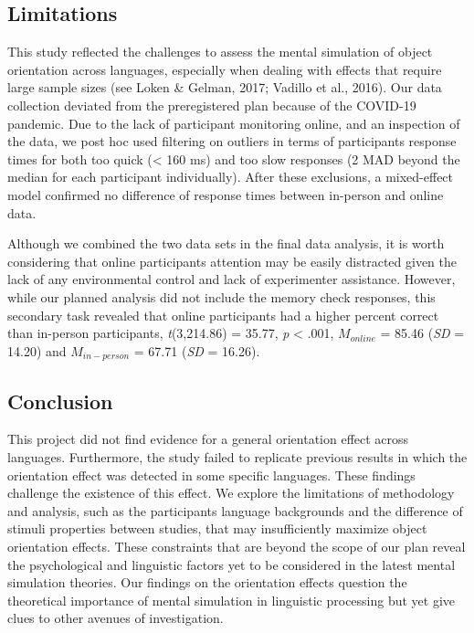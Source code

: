\documentclass[
  man,floatsintext]{apa7}
\begin{document}
\hypertarget{limitations}{%
\subsection{Limitations}\label{limitations}}

This study reflected the challenges to assess the mental simulation of
object orientation across languages, especially when dealing with
effects that require large sample sizes (see Loken \& Gelman, 2017; Vadillo et al., 2016). Our data collection deviated from
the preregistered plan because of the COVID-19 pandemic. Due to the lack
of participant monitoring online, and an inspection of the data, we post
hoc used filtering on outliers in terms of participants\textquotesingle{} response times
for both too quick (\textless{} 160 ms) and too slow responses (2 MAD beyond the
median for each participant individually). After these exclusions, a
mixed-effect model confirmed no difference of response times between
in-person and online data.

Although we combined the two data sets in the final data analysis, it is
worth considering that online participants\textquotesingle{} attention may be easily
distracted given the lack of any environmental control and lack of
experimenter assistance. However, while our planned analysis did not include the memory
check responses, this secondary task revealed that online
participants had a higher percent correct than in-person participants, \emph{t}(3,214.86) = 35.77, \emph{p} \textless{} .001, \(M_{online}\) = 85.46 (\emph{SD} = 14.20) and \(M_{in-person}\) = 67.71 (\emph{SD} = 16.26).

\hypertarget{conclusion}{%
\subsection{Conclusion}\label{conclusion}}

This project did not find evidence for a general orientation effect
across languages. Furthermore, the study failed to replicate previous
results in which the orientation effect was detected in some specific
languages. These findings challenge the existence of this effect. We
explore the limitations of methodology and analysis, such as the
participants\textquotesingle{} language backgrounds and the difference of stimuli
properties between studies, that may insufficiently maximize object
orientation effects. These constraints that are beyond the scope of our
plan reveal the psychological and linguistic factors yet to be
considered in the latest mental simulation theories. Our findings on the
orientation effects question the theoretical importance of mental
simulation in linguistic processing but yet give clues to other avenues
of investigation.
\end{document}

